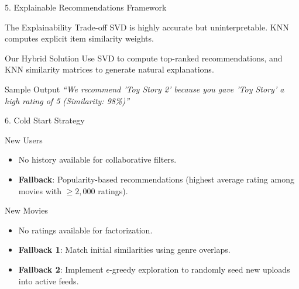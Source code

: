 \documentclass{beamer}
\begin{document}
\begin{frame}{5. Explainable Recommendations Framework}
  \begin{block}{The Explainability Trade-off}
    SVD is highly accurate but uninterpretable. KNN computes explicit item similarity weights.
  \end{block}
  \begin{block}{Our Hybrid Solution}
    Use SVD to compute top-ranked recommendations, and KNN similarity matrices to generate natural explanations.
  \end{block}
  \begin{block}{Sample Output}
    \textit{``We recommend 'Toy Story 2' because you gave 'Toy Story' a high rating of 5 (Similarity: 98\%)''}
  \end{block}
\end{frame}

\begin{frame}{6. Cold Start Strategy}
  \begin{block}{New Users}
    \begin{itemize}
      \item No history available for collaborative filters.
      \item \textbf{Fallback}: Popularity-based recommendations (highest average rating among movies with $\ge 2,000$ ratings).
    \end{itemize}
  \end{block}
  \begin{block}{New Movies}
    \begin{itemize}
      \item No ratings available for factorization.
      \item \textbf{Fallback 1}: Match initial similarities using genre overlaps.
      \item \textbf{Fallback 2}: Implement $\epsilon$-greedy exploration to randomly seed new uploads into active feeds.
    \end{itemize}
  \end{block}
\end{frame}

\end{document}
